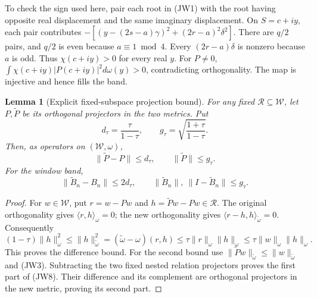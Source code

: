 \documentclass[11pt,a4paper]{article}
\newtheorem{lemma}[theorem]{Lemma}
\begin{document}
To check the sign used here, pair each root in (JW1) with the root
having opposite real displacement and the same imaginary displacement.
On \(S=c+iy\), each pair contributes
\(-[(y-(2s-a)\gamma)^2+(2r-a)^2\delta^2]\).
There are \(q/2\) pairs, and \(q/2\) is even because \(a\equiv1\bmod4\).
Every \((2r-a)\delta\) is nonzero because \(a\) is odd.
Thus \(\chi(c+iy)>0\) for every real \(y\).  For \(P\ne0\),
\(\int\chi(c+iy)|P(c+iy)|^2d\omega(y)>0\), contradicting orthogonality.
The map is injective and hence fills the band.

\begin{lemma}[Explicit fixed-subspace projection bound]
For any fixed \(\mathcal R\subseteq\mathcal W\), let \(P,\widetilde P\)
be its orthogonal projectors in the two metrics.  Put
\[
d_\tau=\frac{\tau}{1-\tau},\qquad
g_\tau=\sqrt{\frac{1+\tau}{1-\tau}}.
\]
Then, as operators on \((\mathcal W,\omega)\),
\[
\|\widetilde P-P\|\le d_\tau,\qquad
\|\widetilde P\|\le g_\tau.
\tag{JW7}
\]
For the window band,
\[
\|\widetilde B_n-B_n\|\le2d_\tau,\qquad
\|\widetilde B_n\|,\ \|I-\widetilde B_n\|\le g_\tau.
\tag{JW8}
\]
\end{lemma}
\begin{proof}
For \(w\in\mathcal W\), put \(r=w-Pw\) and
\(h=\widetilde Pw-Pw\in\mathcal R\).  The original orthogonality gives
\(\langle r,h\rangle_\omega=0\); the new orthogonality gives
\(\langle r-h,h\rangle_{\widetilde\omega}=0\).
Consequently
\[
(1-\tau)\|h\|_\omega^2
\le \|h\|_{\widetilde\omega}^2
= (\widetilde\omega-\omega)(r,h)
\le\tau\|r\|_\omega\|h\|_\omega
\le\tau\|w\|_\omega\|h\|_\omega.
\]
This proves the difference bound.  For the second bound use
\(\|\widetilde Pw\|_{\widetilde\omega}\le
\|w\|_{\widetilde\omega}\) and (JW3).
Subtracting the two fixed nested relation projectors proves the first
part of (JW8).  Their difference and its complement are orthogonal
projectors in the new metric, proving its second part.
\end{proof}
\end{document}

